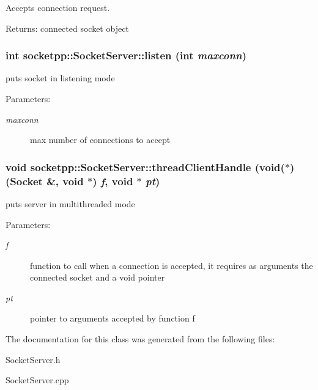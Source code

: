 Accepts connection request. 

\begin{Desc}
\item[Returns:]connected socket object \end{Desc}
\hypertarget{classsocketpp_1_1SocketServer_034ddc2def5342b5a26264ffcb9e8e36}{
\subsubsection[{listen}]{\setlength{\rightskip}{0pt plus 5cm}int socketpp::SocketServer::listen (int {\em maxconn})}}
\label{classsocketpp_1_1SocketServer_034ddc2def5342b5a26264ffcb9e8e36}


puts socket in listening mode 

\begin{Desc}
\item[Parameters:]
\begin{description}
\item[{\em maxconn}]max number of connections to accept \end{description}
\end{Desc}
\hypertarget{classsocketpp_1_1SocketServer_0ded92a6348a6cf953d9f646fac43ac2}{
\subsubsection[{threadClientHandle}]{\setlength{\rightskip}{0pt plus 5cm}void socketpp::SocketServer::threadClientHandle (void($\ast$)({\bf Socket} \&, void $\ast$) {\em f}, \/  void $\ast$ {\em pt})}}
\label{classsocketpp_1_1SocketServer_0ded92a6348a6cf953d9f646fac43ac2}


puts server in multithreaded mode 

\begin{Desc}
\item[Parameters:]
\begin{description}
\item[{\em f}]function to call when a connection is accepted, it requires as arguments the connected socket and a void pointer \item[{\em pt}]pointer to arguments accepted by function f \end{description}
\end{Desc}


The documentation for this class was generated from the following files:\begin{CompactItemize}
\item 
SocketServer.h\item 
SocketServer.cpp\end{CompactItemize}
